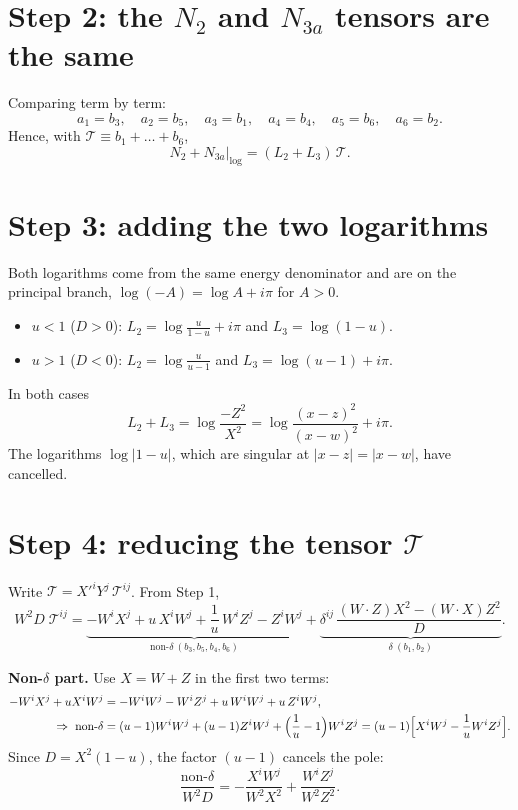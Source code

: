 \documentclass[10pt]{article}
\begin{document}
\section*{Step 2: the $N_{2}$ and $N_{3a}$ tensors are the same}
Comparing term by term:
\begin{equation}
a_{1}=b_{3},\quad a_{2}=b_{5},\quad a_{3}=b_{1},\quad a_{4}=b_{4},\quad a_{5}=b_{6},\quad a_{6}=b_{2}.
\end{equation}
Hence, with $\mathcal T\equiv b_{1}+\dots+b_{6}$,
\begin{equation}
N_{2}+N_{3a}\big|_{\log}=(L_{2}+L_{3})\,\mathcal T.
\end{equation}

\section*{Step 3: adding the two logarithms}
Both logarithms come from the same energy denominator and are on the principal branch, $\log(-A)=\log A+i\pi$ for $A>0$.
\begin{itemize}
\item $u<1$ ($D>0$): $L_{2}=\log\frac{u}{1-u}+i\pi$ and $L_{3}=\log(1-u)$.
\item $u>1$ ($D<0$): $L_{2}=\log\frac{u}{u-1}$ and $L_{3}=\log(u-1)+i\pi$.
\end{itemize}
In both cases
\begin{equation}
L_{2}+L_{3}=\log\frac{-Z^{2}}{X^{2}}=\log\frac{(x-z)^{2}}{(x-w)^{2}}+i\pi .
\end{equation}
The logarithms $\log|1-u|$, which are singular at $|x-z|=|x-w|$, have cancelled.

\section*{Step 4: reducing the tensor $\mathcal T$}
Write $\mathcal T=X'^{i}Y^{j}\,\mathcal T^{ij}$. From Step 1,
\begin{equation}
W^{2}D\;\mathcal T^{ij}=\underbrace{-W^{i}X^{j}+u\,X^{i}W^{j}+\frac{1}{u}\,W^{i}Z^{j}-Z^{i}W^{j}}_{\text{non-}\delta\ (b_{3},b_{5},b_{4},b_{6})}
+\underbrace{\delta^{ij}\,\frac{(W\cdot Z)X^{2}-(W\cdot X)Z^{2}}{D}}_{\delta\ (b_{1},b_{2})}.
\end{equation}

\noindent\textbf{Non-$\delta$ part.} Use $X=W+Z$ in the first two terms:
\begin{align}
-W^{i}X^{j}+uX^{i}W^{j}&=-W^{i}W^{j}-W^{i}Z^{j}+u\,W^{i}W^{j}+u\,Z^{i}W^{j},\notag\\
\Rightarrow\ \text{non-}\delta&=(u-1)W^{i}W^{j}+(u-1)Z^{i}W^{j}+\Big(\frac1u-1\Big)W^{i}Z^{j}
=(u-1)\Big[X^{i}W^{j}-\frac{1}{u}W^{i}Z^{j}\Big].
\end{align}
Since $D=X^{2}(1-u)$, the factor $(u-1)$ cancels the pole:
\begin{equation}
\frac{\text{non-}\delta}{W^{2}D}=-\frac{X^{i}W^{j}}{W^{2}X^{2}}+\frac{W^{i}Z^{j}}{W^{2}Z^{2}}.
\end{equation}
\end{document}

